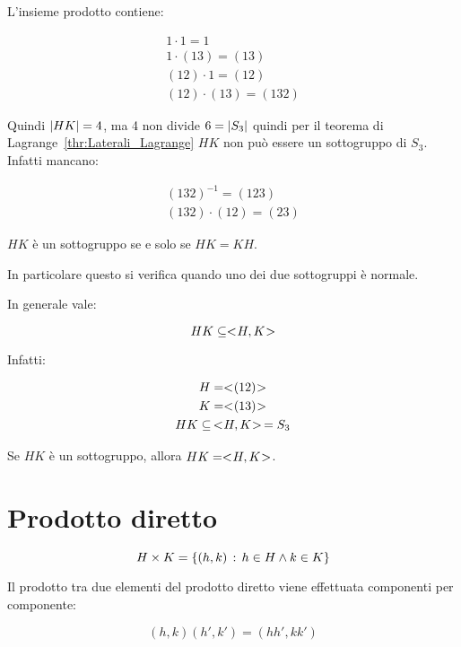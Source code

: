 L'insieme prodotto contiene:

\begin{gather}
	1 \cdot 1 = 1 \\
	1 \cdot (13) = (13) \\
	(12) \cdot 1 = (12) \\
	(12) \cdot (13) = (132)
\end{gather}

Quindi $\lvert HK \rvert = 4$, ma 4 non divide $6 = \lvert S_3 \rvert$ quindi per il teorema di Lagrange~\ref{thr:Laterali_Lagrange} $HK$ non può essere un sottogruppo di $S_3$. Infatti mancano:

\begin{gather}
	(132)^{-1} = (123) \\
	(132)\cdot(12) = (23)
\end{gather}

\begin{teorema}
	$HK$ è un sottogruppo se e solo se $HK = KH$.
	
	In particolare questo si verifica quando uno dei due sottogruppi è normale.
\end{teorema}

In generale vale:

\begin{equation}
	HK \subseteq < \negmedspace H, K \negmedspace >
\end{equation}

Infatti:

\begin{gather}
	H = < \negmedspace (12) \negmedspace > \\
	K = < \negmedspace (13) \negmedspace > \\
	HK \subseteq\, < \negmedspace H, K \negmedspace > \,= S_3
\end{gather}

\begin{teorema}
	Se $HK$ è un sottogruppo, allora $HK = < \negmedspace H, K \negmedspace >$.
\end{teorema}

\section{Prodotto diretto}

\begin{equation}
	H \times K = \{(h, k) \,:\, h \in H \land k \in K\}
\end{equation}

Il prodotto tra due elementi del prodotto diretto viene effettuata componenti per componente:

\begin{equation}
	(h, k)(h', k') = (hh', kk')
\end{equation}

